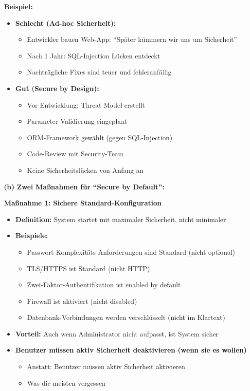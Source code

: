 \documentclass[12pt,a4paper]{article}
\begin{document}
\begin{tcolorbox}[colback=solutionbg, colframe=black!30]

\textbf{Beispiel:}

\begin{itemize}
    \item \textbf{Schlecht (Ad-hoc Sicherheit):}
    \begin{itemize}
        \item Entwickler bauen Web-App: ``Später kümmern wir uns um Sicherheit''
        \item Nach 1 Jahr: SQL-Injection Lücken entdeckt
        \item Nachträgliche Fixes sind teuer und fehleranfällig
    \end{itemize}
    
    \item \textbf{Gut (Secure by Design):}
    \begin{itemize}
        \item Vor Entwicklung: Threat Model erstellt
        \item Parameter-Validierung eingeplant
        \item ORM-Framework gewählt (gegen SQL-Injection)
        \item Code-Review mit Security-Team
        \item Keine Sicherheitslücken von Anfang an
    \end{itemize}
\end{itemize}

\textbf{(b) Zwei Maßnahmen für ``Secure by Default'':} \checkmark

\textbf{Maßnahme 1: Sichere Standard-Konfiguration}

\begin{itemize}
    \item \textbf{Definition:} System startet mit maximaler Sicherheit, nicht minimaler
    \item \textbf{Beispiele:}
    \begin{itemize}
        \item Passwort-Komplexitäts-Anforderungen sind Standard (nicht optional)
        \item TLS/HTTPS ist Standard (nicht HTTP)
        \item Zwei-Faktor-Authentifikation ist enabled by default
        \item Firewall ist aktiviert (nicht disabled)
        \item Datenbank-Verbindungen werden verschlüsselt (nicht im Klartext)
    \end{itemize}
    \item \textbf{Vorteil:} Auch wenn Administrator nicht aufpasst, ist System sicher
    \item \textbf{Benutzer müssen aktiv Sicherheit deaktivieren (wenn sie es wollen)}
    \begin{itemize}
        \item Anstatt: Benutzer müssen aktiv Sicherheit aktivieren
        \item Was die meisten vergessen
    \end{itemize}
\end{itemize}

\end{tcolorbox}
\end{document}
